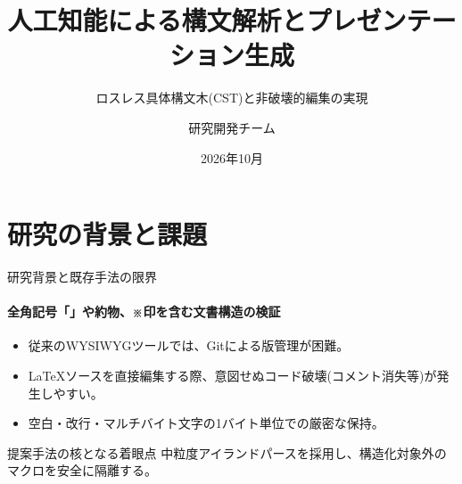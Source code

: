 \documentclass{beamer}
\title{人工知能による構文解析とプレゼンテーション生成}
\subtitle{ロスレス具体構文木(CST)と非破壊的編集の実現}
\author{研究開発チーム}
\date{2026年10月}
\begin{document}
\begin{frame}
  \titlepage
\end{frame}

\section{研究の背景と課題}

\begin{frame}{研究背景と既存手法の限界}
  \framesubtitle{全角記号「」や約物、※印を含む文書構造の検証}
  \begin{itemize}
    \item 従来のWYSIWYGツールでは、Gitによる版管理が困難。
    \item LaTeXソースを直接編集する際、意図せぬコード破壊(コメント消失等)が発生しやすい。
    \item 空白・改行・マルチバイト文字の1バイト単位での厳密な保持。
  \end{itemize}

  \begin{block}{提案手法の核となる着眼点}
    中粒度アイランドパースを採用し、構造化対象外のマクロを安全に隔離する。
  \end{block}
\end{frame}
\end{document}
